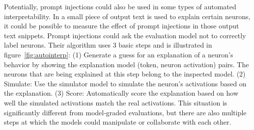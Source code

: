 Potentially, prompt injections could also be used in some types of automated interpretability. In \citet{bills2023language} a small piece of output text is used to explain certain neurons, it could be possible to measure the effect of prompt injections in those output text snippets. Prompt injections could ask the evaluation model not to correctly label neurons.
Their algorithm uses 3 basic steps and is illustrated in figure~\ref{fig:autointerp}: (1) Generate a guess for an explanation of a neuron’s behavior by showing the explanation model (token, neuron activation) pairs. The neurons that are being explained at this step belong to the inspected model.
(2) Simulate: Use the simulator model to simulate the neuron's activations based on the explanation.
(3) Score: Automatically score the explanation based on how well the simulated activations match the real activations.
This situation is significantly different from model-graded evaluations, but there are also multiple steps at which the models could manipulate or collaborate with each other.

  
